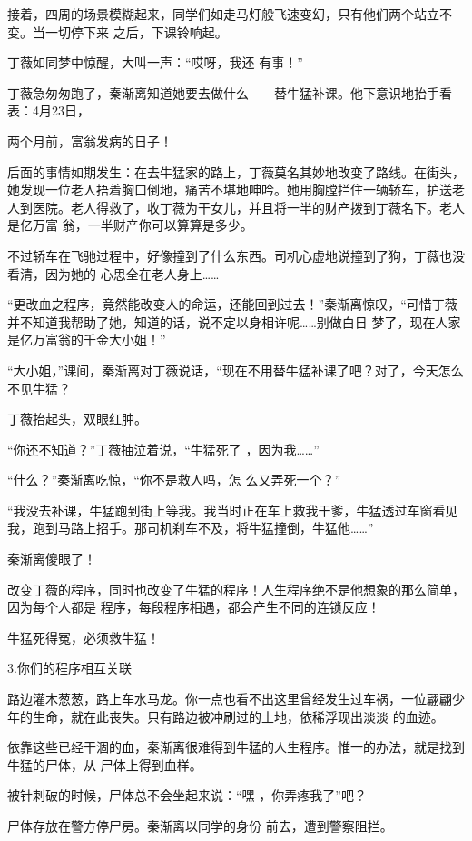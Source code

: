 \documentclass{article}
\begin{document}
接着，四周的场景模糊起来，同学们如走马灯般飞速变幻，只有他们两个站立不变。当一切停下来
之后，下课铃响起。 

丁薇如同梦中惊醒，大叫一声：“哎呀，我还
有事！” 

丁薇急匆匆跑了，秦渐离知道她要去做什么——替牛猛补课。他下意识地抬手看表：4月23日，
\newpage

两个月前，富翁发病的日子！ 

后面的事情如期发生：在去牛猛家的路上，丁薇莫名其妙地改变了路线。在街头，她发现一位老人捂着胸口倒地，痛苦不堪地呻吟。她用胸膛拦住一辆轿车，护送老人到医院。老人得救了，收丁薇为干女儿，并且将一半的财产拨到丁薇名下。老人是亿万富
翁，一半财产你可以算算是多少。 

不过轿车在飞驰过程中，好像撞到了什么东西。司机心虚地说撞到了狗，丁薇也没看清，因为她的
心思全在老人身上…… 

“更改血之程序，竟然能改变人的命运，还能回到过去！”秦渐离惊叹，“可惜丁薇并不知道我帮助了她，知道的话，说不定以身相许呢……别做白日
梦了，现在人家是亿万富翁的千金大小姐！” 

“大小姐，”课间，秦渐离对丁薇说话，“现在不用替牛猛补课了吧？对了，今天怎么不见牛猛？

\newpage


丁薇抬起头，双眼红肿。 

“你还不知道？”丁薇抽泣着说，“牛猛死了
，因为我……” 

“什么？”秦渐离吃惊，“你不是救人吗，怎
么又弄死一个？” 

“我没去补课，牛猛跑到街上等我。我当时正在车上救我干爹，牛猛透过车窗看见我，跑到马路上招手。那司机刹车不及，将牛猛撞倒，牛猛他……”


秦渐离傻眼了！ 

改变丁薇的程序，同时也改变了牛猛的程序！人生程序绝不是他想象的那么简单，因为每个人都是
程序，每段程序相遇，都会产生不同的连锁反应！ 


牛猛死得冤，必须救牛猛！ 


\newpage

3.你们的程序相互关联 

路边灌木葱葱，路上车水马龙。你一点也看不出这里曾经发生过车祸，一位翩翩少年的生命，就在此丧失。只有路边被冲刷过的土地，依稀浮现出淡淡
的血迹。 

依靠这些已经干涸的血，秦渐离很难得到牛猛的人生程序。惟一的办法，就是找到牛猛的尸体，从
尸体上得到血样。 

被针刺破的时候，尸体总不会坐起来说：“嘿
，你弄疼我了”吧？ 

尸体存放在警方停尸房。秦渐离以同学的身份
前去，遭到警察阻拦。 
\end{document}
